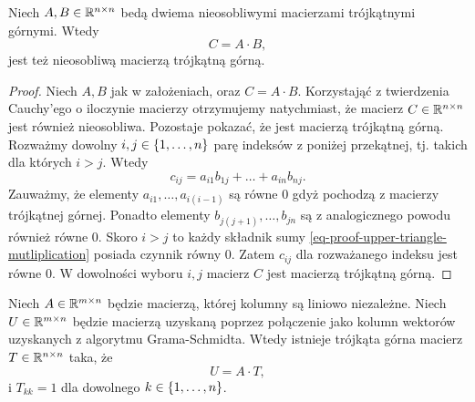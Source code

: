 \documentclass[10pt,a4paper]{report}
\newcommand{\mx}[1]{{#1}}
\begin{document}
\begin{lemma} \label{lemma-upper-triangle-multiplication}
Niech $\mx{A}, \mx{B} \in \setR^{n \times n}$ bedą dwiema nieosobliwymi macierzami trójkątnymi górnymi. Wtedy
$$
\mx{C} = \mx{A} \cdot \mx{B},
$$
jest też nieosobliwą macierzą trójkątną górną.
\end{lemma}

\begin{proof}
Niech $\mx{A}, \mx{B}$ jak w założeniach, oraz $\mx{C} = \mx{A} \cdot \mx{B}$. 
Korzystająć z twierdzenia Cauchy'ego o iloczynie macierzy otrzymujemy natychmiast, że macierz $\mx{C} \in \setR^{n \times n}$ jest również nieosobliwa. Pozostaje pokazać, że jest macierzą trójkątną górną. Rozważmy dowolny $i,j \in \left\lbrace {1, \ldots, n} \right\rbrace$ parę indeksów z poniżej przekątnej, tj. takich dla których $i > j$. Wtedy
\begin{equation}\label{eq-proof-upper-triangle-mutliplication}
c_{ij} = a_{i1} b_{1j} + \ldots +a_{in} b_{nj}.
\end{equation}
Zauważmy, że elementy $a_{i1}, \ldots , a_{i(i-1)}$ są równe $0$ gdyż pochodzą z macierzy trójkątnej górnej. Ponadto elementy $b_{j(j+1)}, \ldots, b_{jn}$ są z analogicznego powodu również równe $0$. Skoro $i > j$ to każdy składnik sumy \eqref{eq-proof-upper-triangle-mutliplication} posiada czynnik równy $0$. Zatem $c_{ij}$ dla rozważanego indeksu jest równe $0$. W dowolności wyboru $i,j$ macierz $\mx{C}$ jest macierzą trójkątną górną.
\end{proof}

\begin{lemma}\label{lemma-gram-schmidt-matrix}
Niech $\mx{A} \in \setR^{m \times n}$ będzie macierzą, której kolumny są liniowo niezależne. Niech $\mx{U} \in \setR^{m \times n}$ będzie macierzą uzyskaną poprzez połączenie jako kolumn wektorów uzyskanych z algorytmu Grama-Schmidta. Wtedy istnieje trójkąta górna macierz $\mx{T} \in \setR^{n \times n}$ taka, że
$$
\mx{U} = \mx{A} \cdot \mx{T},
$$
i $T_{kk} = 1$ dla dowolnego $k \in \left\lbrace {1,\ldots,n} \right\rbrace$.
\end{lemma}
\end{document}
